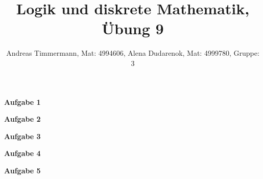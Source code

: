 \documentclass[a4paper]{scrartcl}
\title{Logik und diskrete Mathematik, Übung 9}
\author{Andreas Timmermann, Mat: 4994606, Alena Dudarenok, Mat: 4999780, Gruppe: 3}
\begin{document}
	\maketitle
	\begin{flushleft}
		\textbf{Aufgabe 1}\\
	\end{flushleft}
	\begin{flushleft}
		\textbf{Aufgabe 2}\\
	\end{flushleft}
	\begin{flushleft}
		\textbf{Aufgabe 3}\\
	\end{flushleft}
	\begin{flushleft}
		\textbf{Aufgabe 4}\\
	\end{flushleft}
	\begin{flushleft}
		\textbf{Aufgabe 5}\\
	\end{flushleft}
\end{document}
